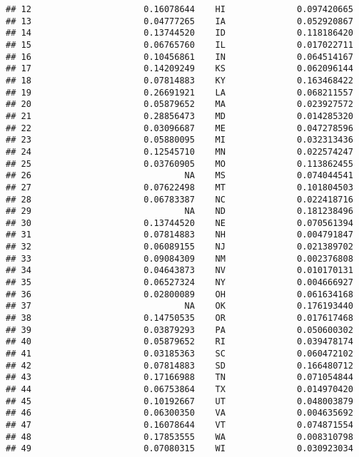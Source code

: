 \documentclass{article}\usepackage[]{graphicx}\usepackage[]{color}
\makeatletter
\newenvironment{kframe}{%
 \def\at@end@of@kframe{}%
 \ifinner\ifhmode%
  \def\at@end@of@kframe{\end{minipage}}%
  \begin{minipage}{\columnwidth}%
 \fi\fi%
 \def\FrameCommand##1{\hskip\@totalleftmargin \hskip-\fboxsep
 \colorbox{shadecolor}{##1}\hskip-\fboxsep
     \hskip-\linewidth \hskip-\@totalleftmargin \hskip\columnwidth}%
 \MakeFramed {\advance\hsize-\width
   \@totalleftmargin\z@ \linewidth\hsize
   \@setminipage}}%
 {\par\unskip\endMakeFramed%
 \at@end@of@kframe}
\newenvironment{knitrout}{}{} %
\makeatother
\begin{document}
\begin{knitrout}
\begin{kframe}
\begin{verbatim}
## 12                      0.16078644    HI              0.097420665
## 13                      0.04777265    IA              0.052920867
## 14                      0.13744520    ID              0.118186420
## 15                      0.06765760    IL              0.017022711
## 16                      0.10456861    IN              0.064514167
## 17                      0.14209249    KS              0.062096144
## 18                      0.07814883    KY              0.163468422
## 19                      0.26691921    LA              0.068211557
## 20                      0.05879652    MA              0.023927572
## 21                      0.28856473    MD              0.014285320
## 22                      0.03096687    ME              0.047278596
## 23                      0.05880095    MI              0.032313436
## 24                      0.12545710    MN              0.022574247
## 25                      0.03760905    MO              0.113862455
## 26                              NA    MS              0.074044541
## 27                      0.07622498    MT              0.101804503
## 28                      0.06783387    NC              0.022418716
## 29                              NA    ND              0.181238496
## 30                      0.13744520    NE              0.070561394
## 31                      0.07814883    NH              0.004791847
## 32                      0.06089155    NJ              0.021389702
## 33                      0.09084309    NM              0.002376808
## 34                      0.04643873    NV              0.010170131
## 35                      0.06527324    NY              0.004666927
## 36                      0.02800089    OH              0.061634168
## 37                              NA    OK              0.176193440
## 38                      0.14750535    OR              0.017617468
## 39                      0.03879293    PA              0.050600302
## 40                      0.05879652    RI              0.039478174
## 41                      0.03185363    SC              0.060472102
## 42                      0.07814883    SD              0.166480712
## 43                      0.17166988    TN              0.071054844
## 44                      0.06753864    TX              0.014970420
## 45                      0.10192667    UT              0.048003879
## 46                      0.06300350    VA              0.004635692
## 47                      0.16078644    VT              0.074871554
## 48                      0.17853555    WA              0.008310798
## 49                      0.07080315    WI              0.030923034

\end{verbatim}
\end{kframe}
\end{knitrout}
\end{document}
